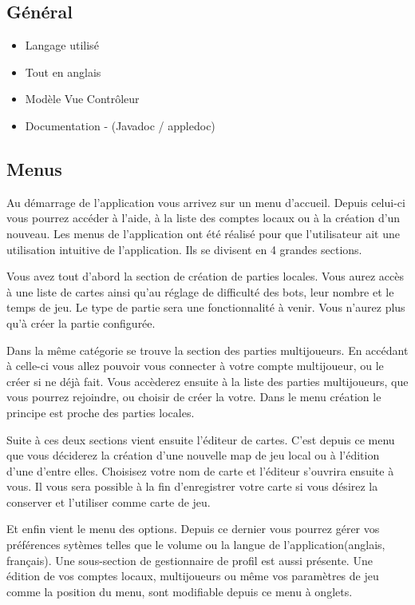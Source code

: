 \subsection{Général}
	\begin{itemize}
		\item{Langage utilisé}
		\item{Tout en anglais}
		\item{Modèle Vue Contrôleur}
		\item{Documentation - (Javadoc / appledoc)}
	\end{itemize}
			
\subsection{Menus}

	Au démarrage de l'application vous arrivez sur un menu d'accueil. Depuis
	celui-ci vous pourrez accéder à l'aide, à la liste des comptes locaux ou à la
	création d'un nouveau.
	Les menus de l'application ont été réalisé pour que l'utilisateur ait
	une utilisation intuitive de l'application. Ils se divisent en 4 grandes sections.
		
	Vous avez tout d'abord la section de création de parties locales. Vous aurez
	accès à une liste de cartes ainsi qu'au réglage de difficulté des bots, leur
	nombre et le temps de jeu. Le type de partie sera une fonctionnalité à venir.
	Vous n'aurez plus qu'à créer la partie configurée.
		
	Dans la même catégorie se trouve la section des parties multijoueurs. En
	accédant à celle-ci vous allez pouvoir vous connecter à votre compte
	multijoueur, ou le créer si ne déjà fait. Vous accèderez ensuite à la liste
	des parties multijoueurs, que vous pourrez rejoindre, ou choisir de créer la
	votre. Dans le menu création le principe est proche des parties locales.
		
	Suite à ces deux sections vient ensuite l'éditeur de cartes. C'est depuis ce
	menu que vous déciderez la création d'une nouvelle map de jeu local ou à
	l'édition d'une d'entre elles. Choisisez votre nom de carte et l'éditeur
	s'ouvrira ensuite à vous. Il vous sera possible à la fin d'enregistrer votre
	carte si vous désirez la conserver et l'utiliser comme carte de jeu.
		
	Et enfin vient le menu des options. Depuis ce dernier vous pourrez gérer vos
	préférences sytèmes telles que le volume ou la langue de
	l'application(anglais, français).
	Une sous-section de gestionnaire de profil
	est aussi présente. Une édition de vos comptes locaux, multijoueurs ou même
	vos paramètres de jeu comme la position du menu, sont modifiable depuis ce
	menu à onglets.
	
